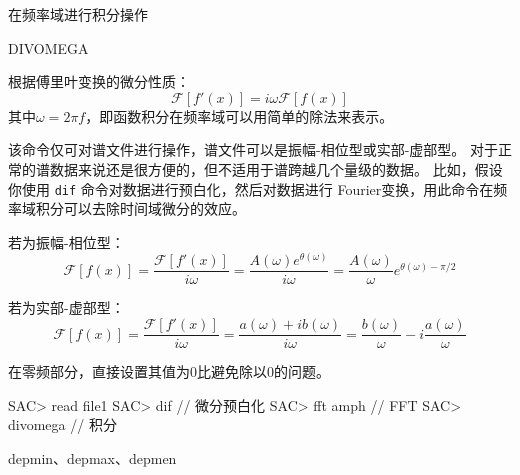 \label{cmd:divomega}

在频率域进行积分操作

\begin{SACSTX}
DIVOMEGA
\end{SACSTX}

根据傅里叶变换的微分性质：
\[
\mathcal{F}[f'(x)]= i \omega \mathcal{F}[f(x)]
\]
其中$\omega = 2 \pi f $，即函数积分在频率域可以用简单的除法来表示。

该命令仅可对谱文件进行操作，谱文件可以是振幅-相位型或实部-虚部型。
对于正常的谱数据来说还是很方便的，但不适用于谱跨越几个量级的数据。
比如，假设你使用 \texttt{dif} 命令对数据进行预白化，然后对数据进行
Fourier变换，用此命令在频率域积分可以去除时间域微分的效应。

若为振幅-相位型：
\[
\mathcal{F}[f(x)] = \frac{\mathcal{F}[f'(x)]}{i \omega}
                  = \frac{A(\omega)e^{\theta(\omega)}}{i \omega}
                  = \frac{A(\omega)}{\omega}e^{\theta(\omega)-\pi/2}
\]

若为实部-虚部型：
\[
\mathcal{F}[f(x)] = \frac{\mathcal{F}[f'(x)]}{i \omega}
                  = \frac{a(\omega)+ib(\omega)}{i \omega}
                  = \frac{b(\omega)}{\omega}-i\frac{a(\omega)}{\omega}
\]

在零频部分，直接设置其值为0比避免除以0的问题。

\begin{SACCode}
SAC> read file1
SAC> dif                // 微分预白化
SAC> fft amph           // FFT
SAC> divomega           // 积分
\end{SACCode}

depmin、depmax、depmen
